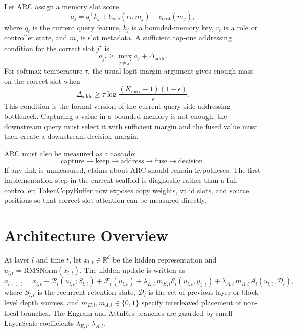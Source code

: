 \documentclass[11pt]{article}
\newcommand{\Ret}{\mathcal{R}}
\newcommand{\Eng}{\mathcal{E}}
\newcommand{\Att}{\mathcal{A}}
\newcommand{\FFN}{\mathcal{F}}
\newcommand{\RMS}{\mathrm{RMSNorm}}
\begin{document}
Let ARC assign a memory slot score
\begin{equation}
a_j = q_t^\top k_j + b_{\mathrm{role}}(r_t,m_j)-c_{\mathrm{cost}}(m_j),
\end{equation}
where $q_t$ is the current query feature, $k_j$ is a bounded-memory key,
$r_t$ is a role or controller state, and $m_j$ is slot metadata. A sufficient
top-one addressing condition for the correct slot $j^\star$ is
\begin{equation}
a_{j^\star}\geq \max_{j\neq j^\star} a_j+\Delta_{\mathrm{addr}}.
\end{equation}
For softmax temperature $\tau$, the usual logit-margin argument gives enough
mass on the correct slot when
\begin{equation}
\Delta_{\mathrm{addr}}\geq
\tau\log\frac{(K_{\max}-1)(1-\epsilon)}{\epsilon}.
\end{equation}
This condition is the formal version of the current query-side addressing
bottleneck. Capturing a value in a bounded memory is not enough; the downstream
query must select it with sufficient margin and the fused value must then create
a downstream decision margin.

ARC must also be measured as a cascade:
\begin{equation}
\mathrm{capture}\rightarrow \mathrm{keep}\rightarrow
\mathrm{address}\rightarrow \mathrm{fuse}\rightarrow \mathrm{decision}.
\end{equation}
If any link is unmeasured, claims about ARC should remain hypotheses. The first
implementation step in the current scaffold is diagnostic rather than a full
controller: TokenCopyBuffer now exposes copy weights, valid slots, and source
positions so that correct-slot attention can be measured directly.

\section{Architecture Overview}

At layer $l$ and time $t$, let $x_{l,t}\in\mathbb{R}^d$ be the hidden representation and $u_{l,t}=\RMS(x_{l,t})$. The hidden update is written as
\begin{equation}
\label{eq:hidden-update}
x_{l+1,t}
= x_{l,t}
+ \Ret_l(u_{l,t}; S_{l,t})
+ \FFN_l(u_{l,t})
+ \lambda_{E,l}\,m_{E,l}\Eng_l(u_{l,t}, y_{1:t})
+ \lambda_{A,l}\,m_{A,l}\Att_l(u_{l,t}, \mathcal{D}_l),
\end{equation}
where $S_{l,t}$ is the recurrent retention state, $\mathcal{D}_l$ is the set of previous layer or block-level depth sources, and $m_{E,l},m_{A,l}\in\{0,1\}$ specify interleaved placement of non-local branches. The Engram and AttnRes branches are guarded by small LayerScale coefficients $\lambda_{E,l},\lambda_{A,l}$.
\end{document}

